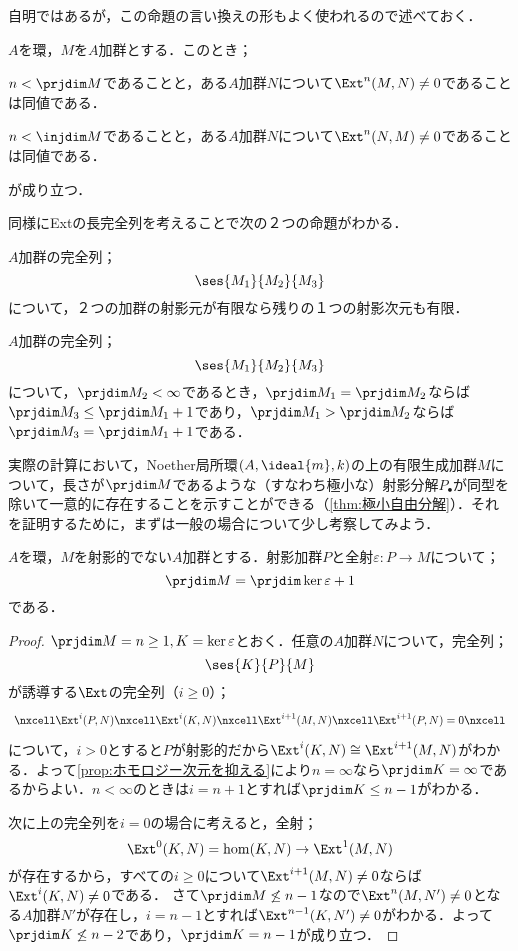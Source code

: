 自明ではあるが，この命題の言い換えの形もよく使われるので述べておく．

\begin{cor}\label{cor:ホモロジー次元の判定法不等式ver}
	$A$を環，$M$を$A$加群とする．このとき；
		\begin{sakura}
		\item $n<\prjdim M$であることと，ある$A$加群$N$について$\Ext^{n}(M,N)\neq0$であることは同値である．
		\item $n<\injdim M$であることと，ある$A$加群$N$について$\Ext^{n}(N,M)\neq0$であることは同値である．
	\end{sakura}
	が成り立つ．
\end{cor}

同様にExtの長完全列を考えることで次の２つの命題がわかる．
\begin{cor}\label{cor:prjdimの有限性}
	$A$加群の完全列；
	\[\ses{M_1}{M_2}{M_3}\]
	について，２つの加群の射影元が有限なら残りの１つの射影次元も有限．
\end{cor}

\begin{cor}\label{cor:prjdim lemma}
	$A$加群の完全列；
	\[\ses{M_1}{M_2}{M_3}\]
	について，$\prjdim M_2<\infty$であるとき，$\prjdim M_1=\prjdim M_2$ならば$\prjdim M_3\leq\prjdim M_1+1$であり，$\prjdim M_1>\prjdim M_2$ならば$\prjdim M_3=\prjdim M_1+1$である．
\end{cor}

実際の計算において，Noether局所環$(A,\ideal{m},k)$の上の有限生成加群$M$について，長さが$\prjdim M$であるような（すなわち極小な）射影分解$P_\bullet$が同型を除いて一意的に存在することを示すことができる（\ref{thm:極小自由分解}）．それを証明するために，まずは一般の場合について少し考察してみよう．

\begin{lem}\label{lem:射影次元ステップアップ}
	$A$を環，$M$を射影的でない$A$加群とする．射影加群$P$と全射$\varepsilon:P\to M$について；
	\[\prjdim M=\prjdim \ker\varepsilon+1\]
	である．
\end{lem}

\begin{proof}
	$\prjdim M=n\geq1, K=\ker\varepsilon$とおく．任意の$A$加群$N$について，完全列；
	\[\ses{K}{P}{M}\]
	が誘導する$\Ext$の完全列（$i\geq0$）；
	\[\begin{tikzcd}
	\nxcell\Ext^i(P,N)\nxcell\Ext^i(K,N)\nxcell\Ext^{i+1}(M,N)\nxcell\Ext^{i+1}(P,N)=0\nxcell
	\end{tikzcd}\]
	について，$i>0$とすると$P$が射影的だから$\Ext^i(K,N)\cong\Ext^{i+1}(M,N)$がわかる．よって\ref{prop:ホモロジー次元を抑える}により$n=\infty$なら$\prjdim K=\infty$であるからよい．$n<\infty$のときは$i=n+1$とすれば$\prjdim K\leq n-1$がわかる．
	
	次に上の完全列を$i=0$の場合に考えると，全射；
	\[\Ext^0(K,N)=\hom(K,N)\to \Ext^1(M,N)\]
	が存在するから，すべての$i\geq0$について$\Ext^{i+1}(M,N)\neq0$ならば$\Ext^i(K,N)\neq0$である．
	さて$\prjdim M\not\leq n-1$なので$\Ext^n(M,N')\neq0$となる$A$加群$N'$が存在し，$i=n-1$とすれば$\Ext^{n-1}(K,N')\neq0$がわかる．よって$\prjdim K\not\leq n-2$であり，$\prjdim K=n-1$が成り立つ．
\end{proof}

